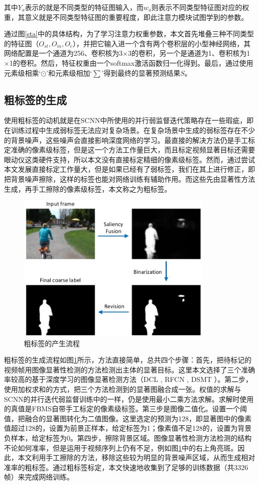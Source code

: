 其中$Y_a$表示的就是不同类型的特征图输入，而$w_a$则表示不同类型特征图对应的权重，其意义就是不同类型特征图的重要程度，即此注意力模块试图学到的参数。

通过图\ref{sta}中的具体结构，为了学习注意力权重参数，本文首先堆叠三种不同类型的特征图（$O_{st}, O_{m}, O_{c}$），并把它输入进一个含有两个卷积层的小型神经网络，其网络配置是一个通道为256、卷积核为3$\times$3的卷积，另一个是通道为1、卷积核为1$\times$1的卷积。然后，特征权重由一个softmax激活函数归一化得到。最后，通过使用元素级相乘`$\odot$'和元素级相加`$\sum$'得到最终的显著预测结果$S$。

\subsection{粗标签的生成}
使用粗标签的动机就是在SCNN中所使用的并行弱监督迭代策略存在一些瑕疵，即在训练过程中生成弱标签无法应对复杂场景。在复杂场景中生成的弱标签存在不少的背景噪声，这些噪声会直接影响深度网络的学习。最直接的解决方法仍是手工标定准确的像素级标签，但是这一个方法工作量巨大，而且标定视频显著目标还需要眼动仪这类硬件支持，所以本文没有直接标定精细的像素级标签。然而，通过尝试本文发展直接标定工作量大，但是如果已经有了弱标签，我们在其上进行修正，即把背景噪声擦除，这样的标签也能对网络训练有辅助作用。而这些先由显著性方法生成，再手工擦除的像素级标签，本文称之为粗标签。

\begin{figure}
 \centering
\includegraphics[width=9.5cm]{figures/labeling2}
\caption{粗标签的产生流程}
\label{labeling2}
\end{figure}

粗标签的生成流程如图\ref{labeling2}所示，方法直接简单，总共四个步骤：首先，把待标记的视频帧用图像显著性检测的方法检测出主体的显著目标。这里本文选择了三个准确率较高的基于深度学习的图像显著检测方法（DCL \cite{li2016deep}, RFCN \cite{wang2016saliency}, DSMT \cite{li2016deepsaliency}）。第二步，使用加权求和的方式，把三个方法检测到的显著图融合成一张。权值的求解与SCNN的并行迭代弱监督训练中的一样，仍是使用最小二乘方法求解。求解时使用的真值是FBMS自带手工标定的像素级标签。第三步是图像二值化。设置一个阈值，把融合的显著图转化为二值图像。这里选定的预测为128，即显著图中的像素值超过128的，设置为前景正样本，给定标签为1；像素值不足128的，设置为背景负样本，给定标签为0。第四步，擦除背景区域。图像显著性检测方法检测的结构不论如何准率，但是运用于视频序列上仍有不足，例如图\ref{labeling2}中的右上角亮斑。因此，本文利用手工擦除的方法，移除这些较为明显的背景噪声区域，从而生成相对准率的粗标签。通过粗标签标定，本文快速地收集到了足够的训练数据（共3326帧）来完成网络训练。


